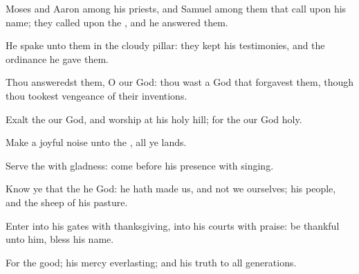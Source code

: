 {\Q {}Moses and
Aaron among his
priests, and
Samuel among them that
call upon his
name; they
called upon the
{}, and he
answered them.


\par }{\Q {}He
spake unto them in the
cloudy
pillar: they
kept his
testimonies, and the
ordinance
{} he
gave them.


\par }{\Q {}Thou
answeredst them, O
{} our
God: thou wast a
God that
forgavest them, though thou tookest
vengeance of their
inventions.


\par }{\Q {}Exalt the
{} our
God, and
worship at his
holy
hill; for the
{} our
God
{}
holy.




\par }
{\Q {}Make a joyful
noise unto the
{}, all ye
lands.


\par }{\Q {}Serve the
{} with
gladness:
come before his
presence with
singing.


\par }{\Q {}Know ye that the
{} he
{}
God:
{} he
{} hath
made us, and not we ourselves;
{} his
people, and the
sheep of his
pasture.


\par }{\Q {}Enter into his
gates with
thanksgiving,
{} into his
courts with
praise: be
thankful unto him,
{}
bless his
name.


\par }{\Q {}For the
{}
{}
good; his
mercy
{}
everlasting; and his
truth
{} to
all
generations.




\par }
